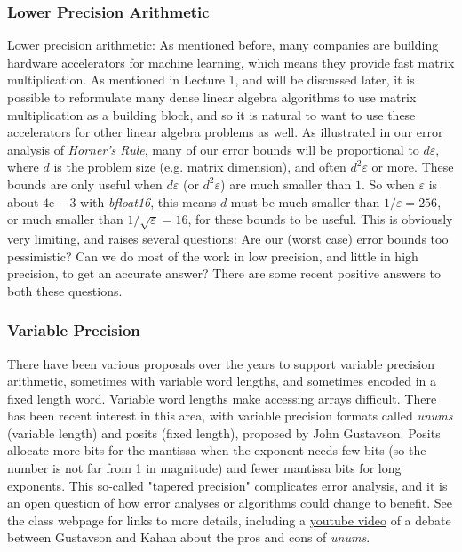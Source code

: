 \documentclass[11pt]{article}
\numberwithin{equation}{section}
\begin{document}
\subsubsection{Lower Precision Arithmetic}
Lower precision arithmetic: As mentioned before, many companies are building hardware accelerators for machine learning, which means they provide fast matrix multiplication. 
As mentioned in Lecture 1, and will be discussed later, it is possible to reformulate many dense linear algebra algorithms to use matrix multiplication as a building block, 
and so it is natural to want to use these accelerators for other linear algebra problems as well. As illustrated in our error analysis of \textit{Horner's Rule}, 
many of our error bounds will be proportional to $d\varepsilon$, where $d$ is the problem size (e.g. matrix dimension), and often $d^2 \varepsilon$ or more. 
These bounds are only useful when $d \varepsilon$ (or $d^2 \varepsilon$) are much smaller than $1$.
So when $\varepsilon$ is about $4\mathrm{e}-3$ with \textit{bfloat16}, this means $d$ must be much smaller than $1/\varepsilon = 256$, 
or much smaller than $1/\sqrt{\varepsilon} = 16$, for these bounds to be useful. This is obviously very limiting, and raises several questions:
Are our (worst case) error bounds too pessimistic? Can we do most of the work in low precision, and little in high precision, to get an accurate answer? 
There are some recent positive answers to both these questions.

\subsubsection{Variable Precision}
There have been various proposals over the years to support variable precision arithmetic, sometimes with variable word lengths, 
and sometimes encoded in a fixed length word. Variable word lengths make accessing arrays difficult. There has been recent interest in this area, 
with variable precision formats called \textit{unums} (variable length) and posits (fixed length), proposed by John Gustavson. 
Posits allocate more bits for the mantissa when the exponent needs few bits (so the number is not far from 1 in magnitude) 
and fewer mantissa bits for long exponents. This so-called "tapered precision" complicates error analysis, 
and it is an open question of how error analyses or algorithms could change to benefit. 
See the class webpage for links to more details, including a \href{https://www.youtube.com/watch?v=LZAeZBVAzVw}{youtube video} of a debate between Gustavson and
Kahan about the pros and cons of \textit{unums}.
\end{document}
